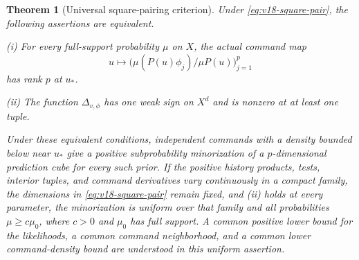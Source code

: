\documentclass[11pt]{amsart}
\newtheorem{theorem}{Theorem}[section]
\theoremstyle{definition}\newtheorem{definition}[theorem]{Definition}
\theoremstyle{remark}\newtheorem{remark}[theorem]{Remark}
\begin{document}
\begin{theorem}[Universal square-pairing criterion]
\label{thm:v18-universal-pairing}
Under \eqref{eq:v18-square-pair}, the following assertions are equivalent.

\smallskip
\noindent\textup{(i)} For every full-support probability $\mu$ on $X$,
the actual command map
\[
 u\longmapsto\bigl(\mu(P(u)\phi_j)/\mu P(u)\bigr)_{j=1}^p
\]
has rank $p$ at $u_*$.

\smallskip
\noindent\textup{(ii)} The function $\Delta_{v,\phi}$ has one weak
sign on $X^d$ and is nonzero at at least one tuple.

\smallskip
Under these equivalent conditions, independent commands with a density
bounded below near $u_*$ give a positive subprobability minorization of
a $p$-dimensional prediction cube for every such prior. If the positive
history products, tests, interior tuples, and command derivatives vary
continuously in a compact family, the dimensions in
\eqref{eq:v18-square-pair} remain fixed, and \textup{(ii)} holds at
every parameter, the minorization is uniform over that family and all
probabilities $\mu\ge c\mu_0$, where $c>0$ and $\mu_0$ has full support.
A common positive lower bound for the likelihoods, a common command
neighborhood, and a common lower command-density bound are understood
in this uniform assertion.
\end{theorem}
\end{document}
